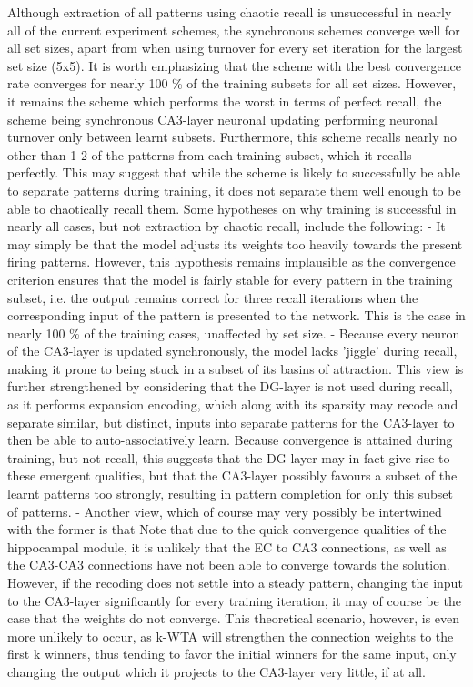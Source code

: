 Although extraction of all patterns using chaotic recall is unsuccessful in nearly all of the current experiment schemes, the synchronous schemes converge well for all set sizes, apart from when using turnover for every set iteration for the largest set size (5x5). It is worth emphasizing that the scheme with the best convergence rate converges for nearly 100 \% of the training subsets for all set sizes. However, it remains the scheme which performs the worst in terms of perfect recall, the scheme being synchronous CA3-layer neuronal updating performing neuronal turnover only between learnt subsets. 
Furthermore, this scheme recalls nearly no other than 1-2 of the patterns from each training subset, which it recalls perfectly. This may suggest that while the scheme is likely to successfully be able to separate patterns during training, it does not separate them well enough to be able to chaotically recall them.
Some hypotheses on why training is successful in nearly all cases, but not extraction by chaotic recall, include the following:
- It may simply be that the model adjusts its weights too heavily towards the present firing patterns. However, this hypothesis remains implausible as the convergence criterion ensures that the model is fairly stable for every pattern in the training subset, i.e. the output remains correct for three recall iterations when the corresponding input of the pattern is presented to the network. This is the case in nearly 100 \% of the training cases, unaffected by set size.
- Because every neuron of the CA3-layer is updated synchronously, the model lacks 'jiggle' during recall, making it prone to being stuck in a subset of its basins of attraction. This view is further strengthened by considering that the DG-layer is not used during recall, as it performs expansion encoding, which along with its sparsity may recode and separate similar, but distinct, inputs into separate patterns for the CA3-layer to then be able to auto-associatively learn. Because convergence is attained during training, but not recall, this suggests that the DG-layer may in fact give rise to these emergent qualities, but that the CA3-layer possibly favours a subset of the learnt patterns too strongly, resulting in pattern completion for only this subset of patterns.
- Another view, which of course may very possibly be intertwined with the former is that
Note that due to the quick convergence qualities of the hippocampal module, it is unlikely that the EC to CA3 connections, as well as the CA3-CA3 connections have not been able to converge towards the solution. However, if the recoding does not settle into a steady pattern, changing the input to the CA3-layer significantly for every training iteration, it may of course be the case that the weights do not converge. This theoretical scenario, however, is even more unlikely to occur, as k-WTA will strengthen the connection weights to the first k winners, thus tending to favor the initial winners for the same input, only changing the output which it projects to the CA3-layer very little, if at all. 
